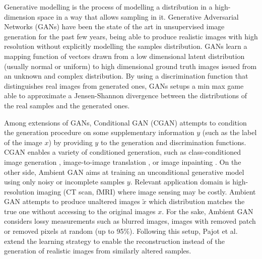 
Generative modelling is the process of modelling a distribution in a high-dimension space in a way that allows sampling in it. Generative Adversarial Networks (GANs) \cite{Goodfellow2014} have been the state of the art in unsupervised image generation for the past few years, being able to produce realistic images with high resolution \cite{Brock2018} without explicitly modelling the samples distribution. GANs learn a mapping function of vectors drawn from a low dimensional latent distribution (usually normal or uniform) to high dimensional ground truth images issued from an unknown and complex distribution. By using a discrimination function that distinguishes real images from generated ones, GANs setups a min max game able to approximate a Jensen-Shannon divergence between the distributions of the real samples and the generated ones.


Among extensions of GANs, Conditional GAN (CGAN) \cite{mirza2014}  attempts to condition the generation procedure on some supplementary information $y$ (such as the label of the image $x$) by providing $y$ to the generation and discrimination functions. CGAN enables a variety of conditioned generation, such as class-conditioned image generation \cite{mirza2014}, image-to-image translation \cite{Isola2017, wang2018high}, or image inpainting \cite{pathak2016context}. On the other side, Ambient GAN \cite{bora2018ambientgan} aims at training an unconditional generative model using only noisy or incomplete samples $y$. Relevant application domain is high-resolution imaging (CT scan, fMRI) where image sensing may be costly. Ambient GAN attempts to produce unaltered images $\tilde{x}$ which distribution matches the true one without accessing to the original images $x$. For the sake, Ambient GAN considers lossy measurements such as blurred images, images with removed patch or removed pixels at random (up to 95\%). Following this setup, Pajot et al.\cite{pajot2018unsupervised} extend the learning strategy to enable the reconstruction instead of the generation of realistic images from similarly altered samples. 

